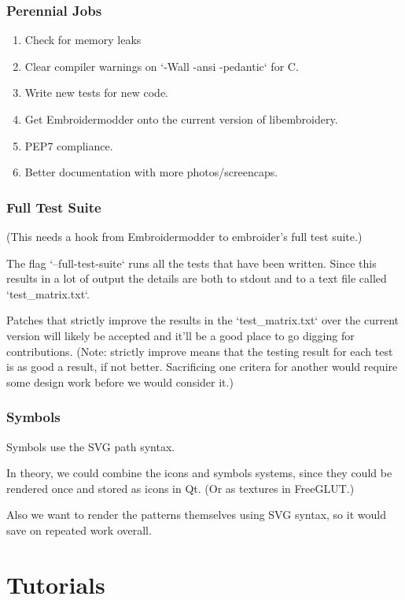 \documentclass{report}
\begin{document}
\subsection{Perennial Jobs}

\begin{enumerate}
\item Check for memory leaks
\item Clear compiler warnings on `-Wall -ansi -pedantic` for C.
\item Write new tests for new code.
\item Get Embroidermodder onto the current version of libembroidery.
\item PEP7 compliance.
\item Better documentation with more photos/screencaps.
\end{enumerate}

\subsection{Full Test Suite}

(This needs a hook from Embroidermodder to embroider's full test suite.)

The flag `--full-test-suite` runs all the tests that have been written.
Since this results in a lot of output the details are both to stdout
and to a text file called `test\_matrix.txt`.

Patches that strictly improve the results in the `test\_matrix.txt` over
the current version will likely be accepted and it'll be a good place
to go digging for contributions. (Note: strictly improve means that
the testing result for each test is as good a result, if not better.
Sacrificing one critera for another would require some design work
before we would consider it.)

\subsection{Symbols}

Symbols use the SVG path syntax.

In theory, we could combine the icons and symbols systems, since they could be rendered once and stored as icons in Qt. (Or as textures in FreeGLUT.)

Also we want to render the patterns themselves using SVG syntax, so it would save on repeated work overall.

\chapter{Tutorials}
\end{document}
